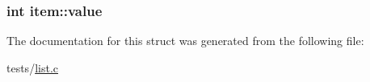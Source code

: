 \subsubsection[{value}]{\setlength{\rightskip}{0pt plus 5cm}int item\+::value}\hypertarget{structitem_a48e03a66deef7b4ec95296391a17a420}{}\label{structitem_a48e03a66deef7b4ec95296391a17a420}


The documentation for this struct was generated from the following file\+:\begin{DoxyCompactItemize}
\item 
tests/\hyperlink{tests_2list_8c}{list.\+c}\end{DoxyCompactItemize}
